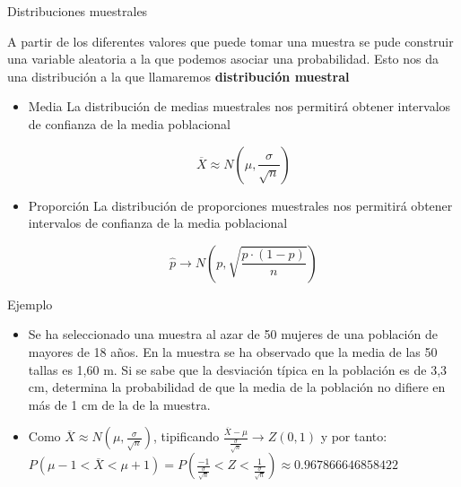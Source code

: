 \documentclass[11pt,handout]{beamer}
\begin{document}
\begin{frame}{Distribuciones muestrales}
\begin{block}{} A partir de los diferentes valores que puede tomar una muestra se pude construir una variable aleatoria a la que podemos asociar una probabilidad. Esto nos da una distribución a la que llamaremos \textbf{distribución muestral}

\end{block}    
\pause
\begin{itemize}[<+->]
    \item{Media} La distribución de medias muestrales nos permitirá obtener intervalos de confianza de la media poblacional
    \begin{block}{}
        $$\overline{X} \approx N\left(\mu,\frac{\sigma}{\sqrt{n}}\right)$$
    \end{block}

    \item{Proporción} La distribución de proporciones muestrales nos permitirá obtener intervalos de confianza de la media poblacional
    \begin{block}{}
    $$\widehat{p} \rightarrow N \left ( p , \sqrt{ \frac{p \cdot (1-p)} {n}}\right )$$
    \end{block}
    
\end{itemize}

\end{frame}

\begin{frame}{Ejemplo}


\begin{itemize}[<+->]
    \item  Se ha seleccionado una muestra al azar de 50 mujeres de una población de mayores
de 18 años. En la muestra se ha observado que la media de las 50 tallas es 1,60 m. Si se sabe que
la desviación típica en la población es de 3,3 cm, determina la probabilidad de que la
media de la población no difiere en más de 1 cm de la de la muestra. 
    \item Como $\overline{X} \approx N\left(\mu,\frac{\sigma}{\sqrt{n}}\right)$, tipificando $\frac{\overline{X} -\mu}{\frac{\sigma}{\sqrt{n}}} \rightarrow Z(0,1)$ y por tanto: $P(\mu-1 < \overline{X} < \mu +1)=P(\frac{-1}{\frac{\sigma}{\sqrt{n}}} < Z < \frac{1}{\frac{\sigma}{\sqrt{n}}})\approx 0.967866646858422$
    
\end{itemize}


\end{frame}
\end{document}
